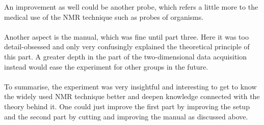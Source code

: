 An improvement as well could be another probe, which refers a little more to the medical use of the NMR technique such as probes of organisms.\\
\\
Another aspect is the manual, which was fine until part three. Here it was too detail-obsessed and only very confusingly explained the theoretical principle of this part. A greater depth in the part of the two-dimensional data acquisition instead would ease the experiment for other groups in the future.\\
\\
To summarise, the experiment was very insightful and interesting to get to know the widely used NMR technique better and deepen knowledge connected with the theory behind it. One could just improve the first part by improving the setup and the second part by cutting and improving the manual as discussed above.\\

